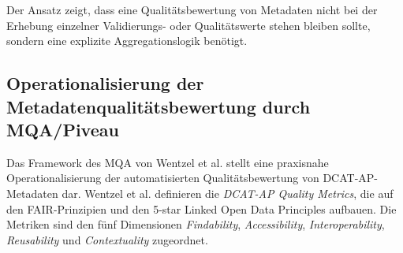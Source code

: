 Der Ansatz zeigt, dass eine Qualitätsbewertung von Metadaten nicht bei der Erhebung einzelner Validierungs- oder Qualitätswerte stehen bleiben sollte, sondern eine explizite Aggregationslogik benötigt. 


\subsection[Metadatenqualitätsbewertung durch MQA/Piveau]{Operationalisierung der Metadatenqualitätsbewertung durch MQA/Piveau}

Das Framework des \acrfull{MQA} von Wentzel et al. stellt eine praxisnahe Operationalisierung der automatisierten Qualitätsbewertung von DCAT-AP-Metadaten dar. 
Wentzel et al. definieren die \textit{DCAT-AP Quality Metrics}, die auf den FAIR-Prinzipien und den 5-star Linked Open Data Principles aufbauen. Die Metriken sind den fünf Dimensionen \textit{Findability}, \textit{Accessibility}, \textit{Interoperability}, \textit{Reusability} und \textit{Contextuality} zugeordnet. 

